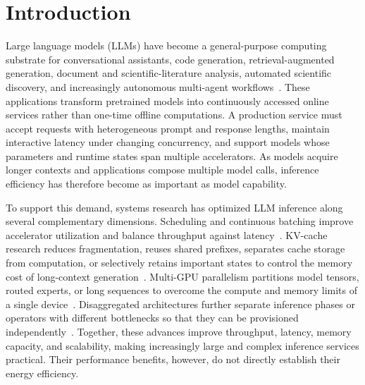 \section{Introduction}
\label{sec:introduction}

Large language models (LLMs) have become a general-purpose computing substrate for conversational assistants, code generation, retrieval-augmented generation, document and scientific-literature analysis, automated scientific discovery, and increasingly autonomous multi-agent workflows~\cite{ouyang2022instructgpt,chen2021codex,lewis2020rag,skarlinski2024paperqa,lu2024aiscientist,wu2024autogen}. These applications transform pretrained models into continuously accessed online services rather than one-time offline computations. A production service must accept requests with heterogeneous prompt and response lengths, maintain interactive latency under changing concurrency, and support models whose parameters and runtime states span multiple accelerators. As models acquire longer contexts and applications compose multiple model calls, inference efficiency has therefore become as important as model capability.

To support this demand, systems research has optimized LLM inference along several complementary dimensions. Scheduling and continuous batching improve accelerator utilization and balance throughput against latency~\cite{yu2022orca,agrawal2024sarathi,sun2024llumnix,duan2024muxserve,hong2025sola}. KV-cache research reduces fragmentation, reuses shared prefixes, separates cache storage from computation, or selectively retains important states to control the memory cost of long-context generation~\cite{kwon2023vllm,zheng2024sglang,qin2024mooncake,zhang2023h2o,xiao2024streamingllm,li2024snapkv,chen2024arkvale,lee2024infinigen,liu2024cachegen,lin2025qserve}. Multi-GPU parallelism partitions model tensors, routed experts, or long sequences to overcome the compute and memory limits of a single device~\cite{shoeybi2019megatron,rajbhandari2022deepspeedmoe,liu2024ringattention,wu2024loongserve,su2025seesaw}. Disaggregated architectures further separate inference phases or operators with different bottlenecks so that they can be provisioned independently~\cite{zhong2024distserve,zhu2025megascale,patel2024splitwise,strati2024dejavu,lin2024infinitellm}. Together, these advances improve throughput, latency, memory capacity, and scalability, making increasingly large and complex inference services practical. Their performance benefits, however, do not directly establish their energy efficiency.

